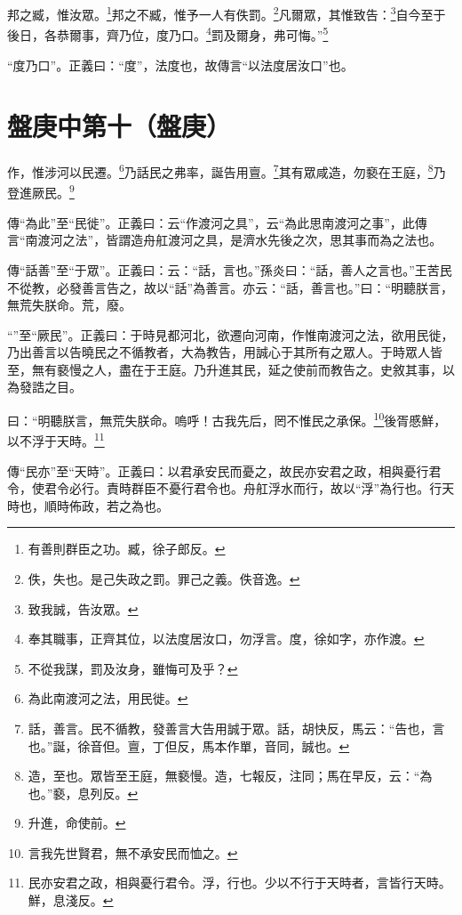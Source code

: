 邦之臧，惟汝眾。\footnote{有善則群臣之功。臧，徐子郎反。}邦之不臧，惟予一人有佚罰。\footnote{佚，失也。是己失政之罰。罪己之義。佚音逸。}凡爾眾，其惟致告：\footnote{致我誠，告汝眾。}自今至于後日，各恭爾事，齊乃位，度乃口。\footnote{奉其職事，正齊其位，以法度居汝口，勿浮言。度，徐如字，亦作渡。}罰及爾身，弗可悔。”\footnote{不從我謀，罰及汝身，雖悔可及乎？}

{\noindent\shu{}\fzkt “度乃口”。正義曰：“度”，法度也，故傳言“以法度居汝口”也。 \par}

\section{盤庚中第十（盤庚）}

作，惟涉河以民遷。\footnote{為此南渡河之法，用民徙。}乃話民之弗率，誕告用亶。\footnote{話，善言。民不循教，發善言大告用誠于眾。話，胡快反，馬云：“告也，言也。”誕，徐音但。亶，丁但反，馬本作單，音同，誠也。}其有眾咸造，勿褻在王庭，\footnote{造，至也。眾皆至王庭，無褻慢。造，七報反，注同；馬在早反，云：“為也。”褻，息列反。}乃登進厥民。\footnote{升進，命使前。}

{\noindent\zhuan{}\fzbyks 傳“為此”至“民徙”。正義曰：云“作渡河之具”，云“為此思南渡河之事”，此傳言“南渡河之法”，皆謂造舟舡渡河之具，是濟水先後之次，思其事而為之法也。 \par}

{\noindent\zhuan{}\fzbyks 傳“話善”至“于眾”。正義曰：云：“話，言也。”孫炎曰：“話，善人之言也。”王苦民不從教，必發善言告之，故以“話”為善言。亦云：“話，善言也。”曰：“明聽朕言，無荒失朕命。荒，廢。 \par}

{\noindent\shu{}\fzkt “”至“厥民”。正義曰：于時見都河北，欲遷向河南，作惟南渡河之法，欲用民徙，乃出善言以告曉民之不循教者，大為教告，用誠心于其所有之眾人。于時眾人皆至，無有褻慢之人，盡在于王庭。乃升進其民，延之使前而教告之。史敘其事，以為發誥之目。 \par}

曰：“明聽朕言，無荒失朕命。嗚呼！古我先后，罔不惟民之承保。\footnote{言我先世賢君，無不承安民而恤之。}後胥慼鮮，以不浮于天時。\footnote{民亦安君之政，相與憂行君令。浮，行也。少以不行于天時者，言皆行天時。鮮，息淺反。}

{\noindent\zhuan{}\fzbyks 傳“民亦”至“天時”。正義曰：以君承安民而憂之，故民亦安君之政，相與憂行君令，使君令必行。責時群臣不憂行君令也。舟舡浮水而行，故以“浮”為行也。行天時也，順時佈政，若之為也。 \par}

